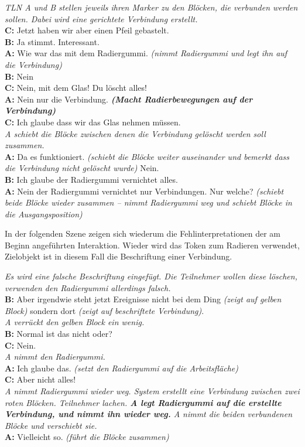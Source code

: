 \begin{transkript}
	\emph{TLN A und B stellen jeweils ihren Marker zu den Blöcken, die verbunden werden sollen. Dabei wird eine gerichtete Verbindung erstellt.}\\
	\textbf{C:} Jetzt haben wir aber einen Pfeil gebastelt.\\
	\textbf{B:} Ja stimmt. Interessant.\\
	\textbf{A:} Wie war das mit dem Radiergummi. \emph{(nimmt Radiergummi und legt ihn auf die Verbindung)}\\
	\textbf{B:} Nein\\
	\textbf{C:} Nein, mit dem Glas! Du löscht alles!\\
	\textbf{A:} Nein nur die Verbindung. \textbf{\emph{(Macht Radierbewegungen auf der Verbindung)}}\\
	\textbf{C:} Ich glaube dass wir das Glas nehmen müssen.\\
	\emph{A schiebt die Blöcke zwischen denen die Verbindung gelöscht werden soll zusammen.}\\
	\textbf{A:} Da es funktioniert. \emph{(schiebt die Blöcke weiter auseinander und bemerkt dass die Verbindung nicht gelöscht wurde)} Nein.\\
	\textbf{B:} Ich glaube der Radiergummi vernichtet alles.\\
	\textbf{A:} Nein der Radiergummi vernichtet nur Verbindungen. Nur welche? \emph{(schiebt beide Blöcke wieder zusammen – nimmt Radiergummi weg und schiebt Blöcke in die Ausgangsposition)}
\end{transkript}

In der folgenden Szene zeigen sich wiederum die Fehlinterpretationen der am Beginn angeführten Interaktion. Wieder wird das Token zum Radieren verwendet, Zielobjekt ist in diesem Fall die Beschriftung einer Verbindung.

\begin{transkript}
	\emph{Es wird eine falsche Beschriftung eingefügt. Die Teilnehmer wollen diese löschen, verwenden den Radiergummi allerdings falsch.}\\
	\textbf{B:} Aber irgendwie steht jetzt Ereignisse nicht bei dem Ding \emph{(zeigt auf gelben Block)} sondern dort \emph{(zeigt auf beschriftete Verbindung)}.\\
	\emph{A verrückt den gelben Block ein wenig.}\\
	\textbf{B:} Normal ist das nicht oder?\\
	\textbf{C:} Nein.\\
	\emph{A nimmt den Radiergummi.}\\
	\textbf{A:} Ich glaube das. \emph{(setzt den Radiergummi auf die Arbeitsfläche)}\\
	\textbf{C:} Aber nicht alles!\\
	\emph{A nimmt Radiergummi wieder weg. System erstellt eine Verbindung zwischen zwei roten Blöcken. Teilnehmer lachen. \textbf{A legt Radiergummi auf die erstellte Verbindung, und nimmt ihn wieder weg.} A nimmt die beiden verbundenen Blöcke und verschiebt sie.}\\
	\textbf{A:} Vielleicht so. \emph{(führt die Blöcke zusammen)}
\end{transkript}

